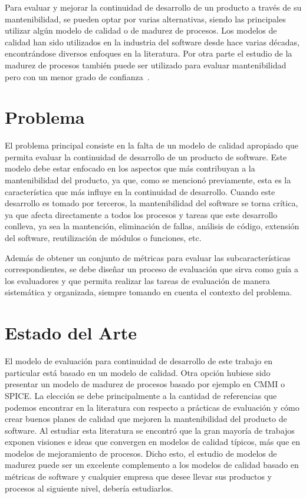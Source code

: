 \documentclass[letterpaper]{article}
\begin{document}
Para evaluar y mejorar la continuidad de desarrollo de un producto a través de su mantenibilidad, se pueden optar por
varias alternativas, siendo las principales utilizar algún modelo de calidad o de madurez de procesos.
Los modelos de calidad han sido utilizados en la industria del software desde hace varias décadas, encontrándose diversos
enfoques en la literatura. Por otra parte el estudio de la madurez de procesos también puede ser utilizado para
evaluar mantenibilidad pero con un menor grado de confianza~\cite{Jones:2000:SAB:335582}.

\section{Problema}
El problema principal consiste en la falta de un modelo de calidad apropiado
que permita evaluar la continuidad de desarrollo de un producto de software.
Este modelo debe estar enfocado en los aspectos que más contribuyan a la mantenibilidad
del producto, ya que, como se mencionó previamente, esta es la característica que más
influye en la continuidad de desarrollo.
Cuando este desarrollo es tomado por terceros, la mantenibilidad
del software se torna crítica, ya que afecta directamente a todos los procesos y tareas
que este desarrollo conlleva, ya sea la mantención, eliminación de fallas, análisis de código,
extensión del software, reutilización de módulos o funciones, etc.

Además de obtener un conjunto de métricas para evaluar las subcaracterísticas
correspondientes, se debe diseñar un proceso de evaluación que sirva como guía a los
evaluadores y que permita realizar las tareas de evaluación de manera sistemática y organizada, 
siempre tomando en cuenta el contexto del problema.

\section{Estado del Arte}
El modelo de evaluación para continuidad de desarrollo
 de este trabajo en particular está basado en un modelo de calidad. Otra opción hubiese sido presentar un modelo
de madurez de procesos basado por ejemplo en CMMI o SPICE. La elección se debe
principalmente a la cantidad de referencias que podemos encontrar en la literatura
con respecto a prácticas de evaluación y cómo crear buenos planes de calidad que mejoren la mantenibilidad
del producto de software. Al estudiar esta literatura se encontró que la gran mayoría
de trabajos exponen visiones e ideas que convergen en modelos de calidad típicos, más
que en modelos de mejoramiento de procesos.
Dicho esto, el estudio de modelos de madurez puede ser un excelente complemento a los modelos de
calidad basado en métricas de software y cualquier empresa que desee llevar sus productos
y procesos al siguiente nivel, debería estudiarlos.
\end{document}
